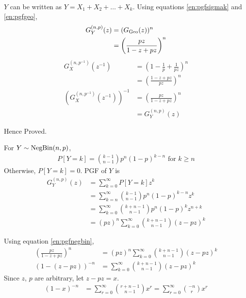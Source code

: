 \begin{solution}
	$Y$ can be written as $Y=X_1+X_2+\dots+X_k$. Using equations
	\ref{en:pgfsigmak} and \ref{en:pgfgeo},
	\begin{align}
		G_Y^{(n,p)}(z) & = (G_{\text{Geo}}(z))^n                    \\
		               & = \left(\frac{pz}{1-z+pz}\right)^n \\
		\label{en:pgfnegbin}
	\end{align}
	\begin{align}
		G_X^{(n,p^{-1})}(z^{-1})                   & = \left(1-\frac{1}{p} + \frac{1}{pz}\right)^n \\
		                                           & = \left(\frac{1-z+pz}{pz}\right)^n            \\
		\left(G_X^{(n,p^{-1})}(z^{-1})\right)^{-1} & =
		\left(\frac{pz}{1-z+pz}\right)^n                                                           \\
		                                           & = G_Y^{(n,p)}(z)
	\end{align}

	Hence Proved.




	For $Y\sim\text{NegBin}(n,p)$,
	\begin{align}
		P[Y=k] = \binom{k-1}{n-1}p^n(1-p)^{k-n}
		\text{ for } k\geq n
	\end{align}
	Otherwise, $P[Y=k]=0$. PGF of $Y$ is
	\begin{align}
		G_Y^{(n,p)}(z) & = \sum_{k=0}^\infty P[Y=k]z^k                           \\
		               & = \sum_{k=n}^\infty \binom{k-1}{n-1}p^n(1-p)^{k-n}z^k   \\
		               & = \sum_{k=0}^\infty \binom{k+n-1}{n-1}p^n(1-p)^kz^{n+k} \\
		               & = (pz)^n\sum_{k=0}^\infty \binom{k+n-1}{n-1}(z-pz)^k
	\end{align}

	Using equation \ref{en:pgfnegbin},
	\begin{align}
		\left(\frac{pz}{1-z+pz}\right)^n & = (pz)^n\sum_{k=0}^\infty \binom{k+n-1}{n-1}(z-pz)^k \\
		\left(1-(z-pz)\right)^{-n}       & = \sum_{k=0}^\infty \binom{k+n-1}{n-1}(z-pz)^k
	\end{align}
	Since $z$, $p$ are arbitrary, let $z-pz = x$.
	\begin{align}
		(1-x)^{-n} & = \sum_{r=0}^\infty \binom{r+n-1}{n-1}x^r = \sum_{r=0}^\infty \binom{-n}{r}x^r
	\end{align}


\end{solution}
